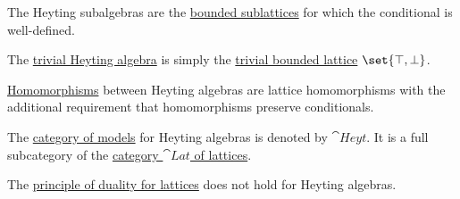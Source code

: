 \begin{definition}
\begin{thmenum}
     The Heyting subalgebras are the \hyperref[def:semilattice/submodel]{bounded sublattices} for which the conditional is well-defined.

     The \hyperref[thm:substructures_form_complete_lattice/bottom]{trivial Heyting algebra} is simply the \hyperref[def:semilattice/trivial]{trivial bounded lattice} \( \set{ \top, \bot } \).

     \hyperref[def:first_order_homomorphism]{Homomorphisms} between Heyting algebras are lattice homomorphisms with the additional requirement that homomorphisms preserve conditionals.

     The \hyperref[def:category_of_first_order_models]{category of models} for Heyting algebras is denoted by \( \cat{Heyt} \). It is a full subcategory of the \hyperref[def:semilattice/category]{category \( \cat{Lat} \) of lattices}.

     The \hyperref[def:semilattice/lattice_duality]{principle of duality for lattices} does not hold for Heyting algebras.
  \end{thmenum}
\end{definition}

